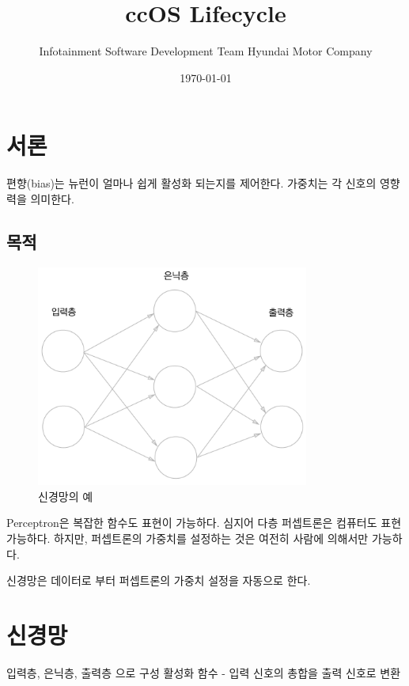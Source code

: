 \documentclass[12pt]{article}
\title{ccOS Lifecycle}
\author{Infotainment Software Development Team \newline Hyundai Motor Company \newline }
\date{\today}
\begin{document}
	\maketitle
	
	\tableofcontents
	
	\clearpage
	\section{서론}
	
	편향(bias)는 뉴런이 얼마나 쉽게 활성화 되는지를 제어한다.
	가중치는 각 신호의 영향력을 의미한다.
	
	\subsection{목적}
	
	\begin{figure}[!h] %
		\centering
		\includegraphics[width=0.8\textwidth]{fig/fig-3-1.png}
		\caption{신경망의 예}
	\end{figure}
	
	
	Perceptron은 복잡한 함수도 표현이 가능하다. 심지어 다층 퍼셉트론은 컴퓨터도 표현 가능하다.
	하지만, 퍼셉트론의 가중치를 설정하는 것은 여전히 사람에 의해서만 가능하다.
	
	신경망은 데이터로 부터 퍼셉트론의 가중치 설정을 자동으로 한다.
	
	\clearpage
	\section{신경망}
	입력층, 은닉층, 출력층 으로 구성
	활성화 함수 - 입력 신호의 총합을 출력 신호로 변환
	
\end{document}
